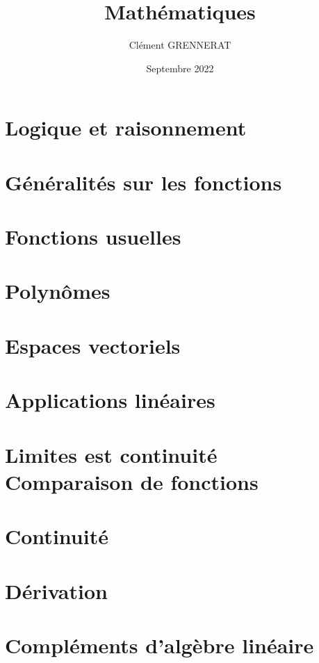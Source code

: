 \documentclass[13pt, twoside, a4paper, french]{report}
\newcommand*{\getSubject}{Mathématiques}
\begin{document}
    \title{\getSubject}
    \author{Clément GRENNERAT}
    \date{Septembre 2022}
    \pagestyle{non-chapter-style}


    \chapter{Logique et raisonnement}\label{ch:logique-et-raisonnement}
        


    \chapter{Généralités sur les fonctions}\label{ch:generalites-sur-les-fonctions}
        


    \chapter{Fonctions usuelles}\label{ch:fonctions-usuelles}
        


    \chapter{Polynômes}\label{ch:polynomes}
        


    \chapter{Espaces vectoriels}\label{ch:espaces-vectoriels}
        


    \chapter{Applications linéaires}\label{ch:applications-lineaires}
        


    \chapter{Limites est continuité\\Comparaison de fonctions}\label{ch:limites-est-continuite---comparaison-de-fonctions}
        


    \chapter{Continuité}\label{ch:continuite}
        


    \chapter{Dérivation}\label{ch:derivation}
        


    \chapter{Compléments d'algèbre linéaire}\label{ch:complements-d-algebre-lineaire}
        
\end{document}

